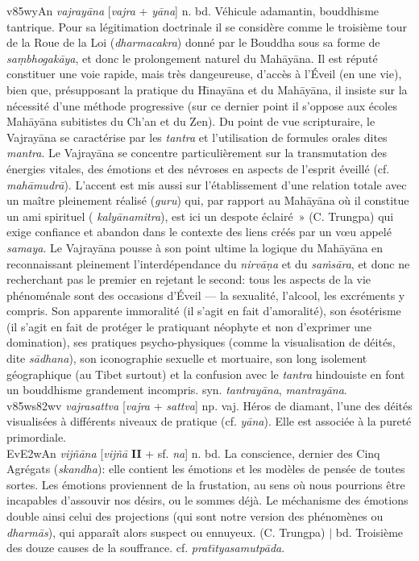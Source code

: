 \documentclass[a4paper,11pt,twocolumn]{article}
\begin{document}
{\dn v\385wyAn} {\em vajray\={a}na} [{\em vajra} + {\em y\={a}na}]
n. bd. \og Véhicule adamantin\fg, bouddhisme tantrique. Pour sa
légitimation doctrinale il se considère comme le troisième tour de la
Roue de la Loi ({\em dharmacakra}) donné par le Bouddha sous sa forme
de  {\em sa\d{m}bhogak\={a}ya}, et donc le prolongement naturel du
Mah\={a}y\={a}na. Il est réputé constituer une voie rapide, mais très
dangeureuse, d'accès à l'Éveil (en une vie), bien que, présupposant la
pratique du H\={\i}nay\={a}na et du Mah\={a}y\={a}na, il
insiste sur la nécessité d'une méthode progressive (sur ce
dernier point il s'oppose aux écoles Mah\={a}y\={a}na subitistes
du Ch'an et du Zen). Du point de vue scripturaire, le Vajray\={a}na se
caractérise par les {\em tantra} et l'utilisation de formules orales
dites {\em mantra}. Le Vajray\={a}na se concentre particulièrement sur
la transmutation des énergies vitales, des émotions et des névroses
en aspects de l'esprit éveillé (cf. {\em mah\={a}mudr\={a}}). L'accent
est mis aussi sur l'établissement d'une relation totale avec un maître
pleinement réalisé ({\em guru}) qui, par rapport au
Mah\={a}y\={a}na où il constitue un ami spirituel ({\em
kaly\={a}namitra}), est ici \og un despote éclairé~» (C. Trungpa) qui
exige confiance et abandon dans le contexte des liens créés par un
v{\oe}u appelé {\em samaya}. Le Vajray\={a}na pousse à son point ultime
la logique du Mah\={a}y\={a}na en reconnaissant pleinement
l'interdépendance du {\em nirv\={a}\d{n}a} et du {\em
sa\.{m}s\={a}ra}, et donc ne recherchant pas le premier en rejetant le
second: tous les aspects de la vie phénoménale sont des occasions
d'Éveil --- la sexualité, l'alcool, les excréments y compris. Son
apparente immoralité (il s'agit en fait d'amoralité), son ésotérisme
(il s'agit en fait de protéger le pratiquant néophyte et non d'exprimer une
domination), ses pratiques psycho-physiques (comme la visualisation de
déités, dite {\em s\={a}dhana}), son iconographie sexuelle et mortuaire,
son long isolement géographique (au Tibet surtout) et la
confusion avec le {\em tantra} hindouiste en font un bouddhisme
grandement incompris. syn. {\em tantray\={a}na}, {\em
mantray\={a}na}. \\

{\dn v\385ws\382wv} {\em vajrasattva} [{\em vajra} + {\em
sattva}] np. vaj. \og Héros de diamant\fg, l'une des déités visualisées
à différents niveaux de pratique (cf. {\em y\={a}na}). Elle est associée
à la pureté primordiale. \\

{\dn Ev\3E2wAn} {\em vij\~{n}\={a}na} [{\em vijñ\={a}} {\bf II} +
sf. {\em na}] n. bd. \og La conscience\fg, dernier des Cinq Agrégats
({\em skandha}): elle contient les émotions et les
modèles de pensée de toutes sortes. Les émotions proviennent de
la frustation, au sens où nous pourrions être incapables d'assouvir
nos désirs, ou le sommes déjà. Le méchanisme des émotions
double ainsi celui des projections (qui sont notre version des
phénomènes ou {\em dharm\={a}s}), qui apparaît alors suspect ou
ennuyeux. (C. Trungpa) $\mid$ bd. Troisième des douze causes de
la souffrance. cf. {\em prat\={\i}tyasamutp\={a}da}. \\
\end{document}
